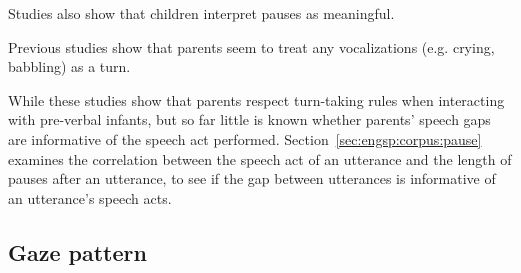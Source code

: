 Studies also show that children interpret pauses as meaningful. %

Previous studies show that parents seem to treat any vocalizations (e.g. crying, babbling) as a turn. 


While these studies show that parents respect turn-taking rules when interacting with pre-verbal infants, but so far little is known whether parents' speech gaps are informative of the speech act performed. Section~\ref{sec:engsp:corpus:pause} examines the correlation between the speech act of an utterance and the length of pauses after an utterance, to see if the gap between utterances is informative of an utterance's speech acts. 

\subsection{Gaze pattern}
\label{sec:engsp:bg:gaze}

